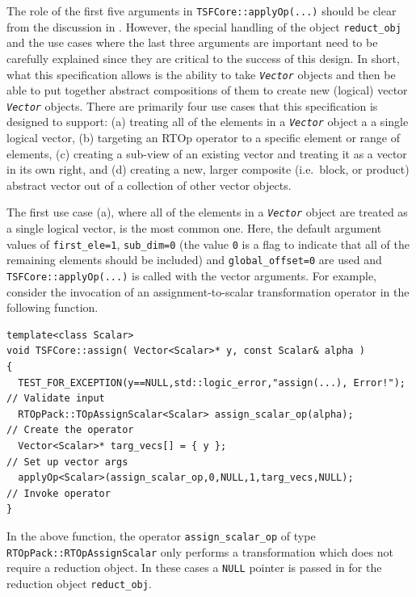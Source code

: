 The role of the first five arguments in \texttt{TSFCore::applyOp(\-...)}
should be clear from the discussion in \cite{ref:rtop_toms}.  However,
the special handling of the object \texttt{reduct\_obj} and the use
cases where the last three arguments are important need to be
carefully explained since they are critical to the success of this
design.  In short, what this specification allows is the ability to
take \texttt{\textit{Vector}} objects and then be able to put together
abstract compositions of them to create new (logical) vector
\texttt{\textit{Vector}} objects.  There are primarily four use cases
that this specification is designed to support: (a) treating all of
the elements in a \texttt{\textit{Vector}} object a a single logical
vector, (b) targeting an RTOp operator to a specific element or range
of elements, (c) creating a sub-view of an existing vector and
treating it as a vector in its own right, and (d) creating a new,
larger composite (i.e.~block, or product) abstract vector out of a
collection of other vector objects.

The first use case (a), where all of the elements in a
\texttt{\textit{Vector}} object are treated as a single logical
vector, is the most common one.  Here, the default argument values of
\texttt{first\_ele=1}, \texttt{sub\_dim=0} (the value \texttt{0} is a
flag to indicate that all of the remaining elements should be
included) and \texttt{global\_offset=0} are used and
\texttt{TSFCore::applyOp(\-...)} is called with the vector arguments.
For example, consider the invocation of an assignment-to-scalar
transformation operator in the following function.

{\scriptsize\begin{verbatim}
template<class Scalar>
void TSFCore::assign( Vector<Scalar>* y, const Scalar& alpha )
{
  TEST_FOR_EXCEPTION(y==NULL,std::logic_error,"assign(...), Error!");  // Validate input
  RTOpPack::TOpAssignScalar<Scalar> assign_scalar_op(alpha);           // Create the operator
  Vector<Scalar>* targ_vecs[] = { y };                                 // Set up vector args
  applyOp<Scalar>(assign_scalar_op,0,NULL,1,targ_vecs,NULL);           // Invoke operator
}
\end{verbatim}}

{}\noindent{}In the above function, the operator \texttt{assign\_scalar\_op} of type
\texttt{RTOpPack::RTOpAssignScalar} only performs a transformation which
does not require a reduction object.  In these cases a {}\texttt{NULL}
pointer is passed in for the reduction object \texttt{reduct\_obj}.


